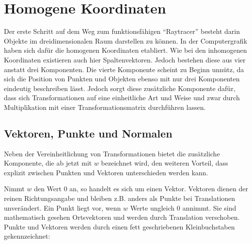 
\chapter{Homogene Koordinaten}\label{cha:hom_koord}

Der erste Schritt auf dem Weg zum funktionsfähigen "`Raytracer"' besteht darin Objekte im dreidimensionalen Raum darstellen zu können. In der Computergrafik haben sich dafür die homogenen Koordinaten etabliert. Wie bei den inhomogenen Koordinaten existieren auch hier Spaltenvektoren. Jedoch bestehen diese aus vier anstatt drei Komponenten. Die vierte Komponente scheint zu Beginn unnütz, da sich die Position von Punkten und Objekten ebenso mit nur drei Komponenten eindeutig beschreiben lässt. Jedoch sorgt diese zusätzliche Komponente dafür, dass sich Transformationen auf eine einheitliche Art und Weise und zwar durch Multiplikation mit einer Transformationsmatrix durchführen lassen.


\section{Vektoren, Punkte und Normalen}

Neben der Vereinheitlichung von Transformationen bietet die zusätzliche Komponente, die ab jetzt mit \( w \) bezeichnet wird, den weiteren Vorteil, dass explizit zwischen Punkten und Vektoren unterschieden werden kann.

Nimmt  \( w \) den Wert \( 0 \) an, so handelt es sich um einen Vektor. Vektoren dienen der reinen Richtungsangabe und bleiben z.B. anders als Punkte bei Translationen unverändert. Ein Punkt liegt vor, wenn \( w \) Werte ungleich \( 0 \) annimmt. Sie sind mathematisch gesehen Ortsvektoren und werden durch Translation verschoben. Punkte und Vektoren werden durch einen fett geschriebenen Kleinbuchstaben gekennzeichnet:




